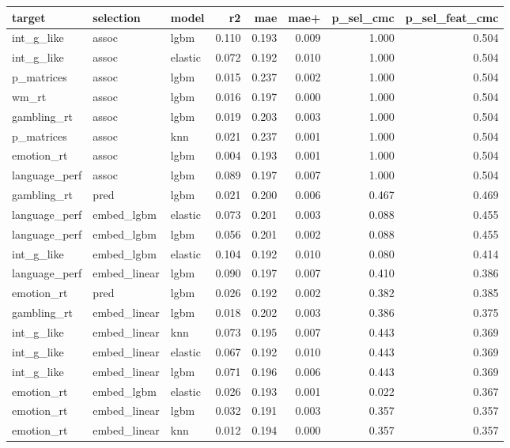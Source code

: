 \documentclass{article}
\begin{document}
\begin{table}
\centering
\begin{tabular}{lllrrrrr}
	\toprule
	target & selection & model & r2 & mae & mae+ & p\_sel\_cmc & p\_sel\_feat\_cmc \\
	\midrule
	int\_g\_like & assoc & lgbm & 0.110 & 0.193 & 0.009 & 1.000 & 0.504 \\
	int\_g\_like & assoc & elastic & 0.072 & 0.192 & 0.010 & 1.000 & 0.504 \\
	p\_matrices & assoc & lgbm & 0.015 & 0.237 & 0.002 & 1.000 & 0.504 \\
	wm\_rt & assoc & lgbm & 0.016 & 0.197 & 0.000 & 1.000 & 0.504 \\
	gambling\_rt & assoc & lgbm & 0.019 & 0.203 & 0.003 & 1.000 & 0.504 \\
	p\_matrices & assoc & knn & 0.021 & 0.237 & 0.001 & 1.000 & 0.504 \\
	emotion\_rt & assoc & lgbm & 0.004 & 0.193 & 0.001 & 1.000 & 0.504 \\
	language\_perf & assoc & lgbm & 0.089 & 0.197 & 0.007 & 1.000 & 0.504 \\
	gambling\_rt & pred & lgbm & 0.021 & 0.200 & 0.006 & 0.467 & 0.469 \\
	language\_perf & embed\_lgbm & elastic & 0.073 & 0.201 & 0.003 & 0.088 & 0.455 \\
	language\_perf & embed\_lgbm & lgbm & 0.056 & 0.201 & 0.002 & 0.088 & 0.455 \\
	int\_g\_like & embed\_lgbm & elastic & 0.104 & 0.192 & 0.010 & 0.080 & 0.414 \\
	language\_perf & embed\_linear & lgbm & 0.090 & 0.197 & 0.007 & 0.410 & 0.386 \\
	emotion\_rt & pred & lgbm & 0.026 & 0.192 & 0.002 & 0.382 & 0.385 \\
	gambling\_rt & embed\_linear & lgbm & 0.018 & 0.202 & 0.003 & 0.386 & 0.375 \\
	int\_g\_like & embed\_linear & knn & 0.073 & 0.195 & 0.007 & 0.443 & 0.369 \\
	int\_g\_like & embed\_linear & elastic & 0.067 & 0.192 & 0.010 & 0.443 & 0.369 \\
	int\_g\_like & embed\_linear & lgbm & 0.071 & 0.196 & 0.006 & 0.443 & 0.369 \\
	emotion\_rt & embed\_lgbm & elastic & 0.026 & 0.193 & 0.001 & 0.022 & 0.367 \\
	emotion\_rt & embed\_linear & lgbm & 0.032 & 0.191 & 0.003 & 0.357 & 0.357 \\
	emotion\_rt & embed\_linear & knn & 0.012 & 0.194 & 0.000 & 0.357 & 0.357 \\

\end{tabular}
\end{table}
\end{document}
